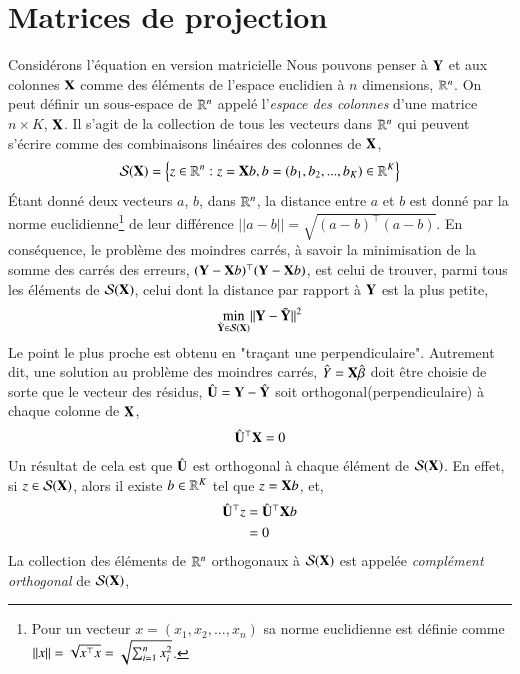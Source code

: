  \section{Matrices de projection}
 Considérons l'équation en version matricielle 
Nous pouvons penser à $\mathbf Y$ et aux colonnes $\mathbf X$ comme des éléments de l'espace euclidien à $n$ dimensions, $\mathbb{R}^n$. On peut définir un sous-espace de $\mathbb{R}^n$ appelé l'\emph{espace des colonnes} d'une matrice $n\times K$, $\mathbf X$. Il s'agit de la collection de tous les vecteurs dans $\mathbb{R}^n$ qui peuvent s'écrire comme des combinaisons linéaires des colonnes de $\mathbf X$,
\begin{align*}
\mathcal{S}(\mathbf X) = \left\{z \in \mathbb{R}^n: z = \mathbf X b, b = (b_1, b_2,...,b_K) \in \mathbb{R}^K  \right\}
\end{align*}
\'Etant donné deux vecteurs $a$, $b$, dans $\mathbb{R}^n$, la distance entre $a$ et $b$ est donné par la norme euclidienne\footnote{Pour un vecteur $x=(x_1, x_2,...,x_n)$ sa norme euclidienne est définie comme $||x|| = \sqrt{x^\top x} = \sqrt{\sum_{i=1}^n x_i^2}$.} de leur différence $||a-b|| = \sqrt{(a-b)^\top(a-b)}$. En conséquence, le problème des moindres carrés, à savoir la minimisation de la somme des carrés des erreurs, $(\mathbf Y-\mathbf X b)^\top(\mathbf Y-\mathbf X b)$, est celui de trouver, parmi tous les éléments de $\mathcal{S}(\mathbf X)$, celui dont la distance par rapport à $\mathbf Y$ est la plus petite,
\begin{align*}
\underset{\tilde{\mathbf Y}\in \mathcal{S}(\mathbf X)}{\min} ||\mathbf Y - \tilde{\mathbf Y}||^2
\end{align*}
Le point le plus proche est obtenu en "traçant une perpendiculaire". Autrement dit, une solution au problème des moindres carrés, $\hat{Y} = \mathbf X\hat{\beta}$ doit être choisie de sorte que le vecteur des résidus, $\hat{\mathbf U} = \mathbf Y-\hat{\mathbf Y}$ soit orthogonal(perpendiculaire) à chaque colonne de $\mathbf X$,
\begin{align*}
\hat{\mathbf U}^\top\mathbf X = 0
\end{align*}
Un  résultat de cela est que $\hat{\mathbf U}$ est orthogonal à chaque élément de $\mathcal{S}(\mathbf X)$. En effet, si $z\in \mathcal{S}(\mathbf X)$, alors il existe $b\in\mathbb{R}^K$ tel que $z=\mathbf X b$, et,
\begin{align*}
\hat{\mathbf U}^\top z &= \hat{\mathbf U}^\top\mathbf X b\\
& = 0
\end{align*}
La collection des éléments de $\mathbb{R}^n$ orthogonaux à $\mathcal{S}(\mathbf X)$ est appelée \emph{complément orthogonal} de $\mathcal{S}(\mathbf X)$,
